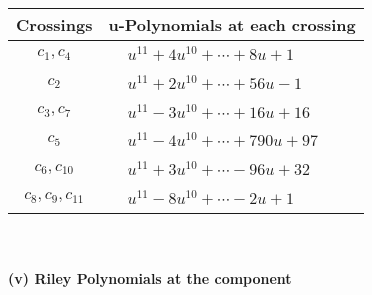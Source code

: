 \documentclass[1p]{elsarticle_modified}
\theoremstyle{definition}
\begin{document}
\begin{tabular}{m{50pt}|m{274pt}}
Crossings & \hspace{64pt}u-Polynomials at each crossing \\
\hline $$\begin{aligned}c_{1},c_{4}\end{aligned}$$&$\begin{aligned}
&u^{11}+4 u^{10}+\cdots+8 u+1
\end{aligned}$\\
\hline $$\begin{aligned}c_{2}\end{aligned}$$&$\begin{aligned}
&u^{11}+2 u^{10}+\cdots+56 u-1
\end{aligned}$\\
\hline $$\begin{aligned}c_{3},c_{7}\end{aligned}$$&$\begin{aligned}
&u^{11}-3 u^{10}+\cdots+16 u+16
\end{aligned}$\\
\hline $$\begin{aligned}c_{5}\end{aligned}$$&$\begin{aligned}
&u^{11}-4 u^{10}+\cdots+790 u+97
\end{aligned}$\\
\hline $$\begin{aligned}c_{6},c_{10}\end{aligned}$$&$\begin{aligned}
&u^{11}+3 u^{10}+\cdots-96 u+32
\end{aligned}$\\
\hline $$\begin{aligned}c_{8},c_{9},c_{11}\end{aligned}$$&$\begin{aligned}
&u^{11}-8 u^{10}+\cdots-2 u+1
\end{aligned}$\\
\hline
\end{tabular}\\~\\
\newpage\renewcommand{\arraystretch}{1}
\flushleft \textbf{(v) Riley Polynomials at the component}\newline \\
\end{document}
